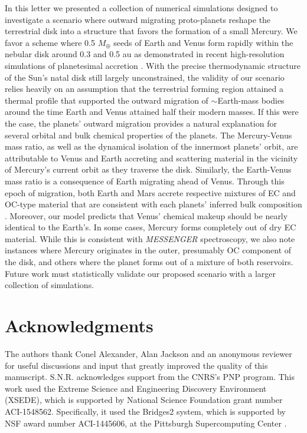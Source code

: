 \documentclass[trackchanges,twocolumn]{aastex}
\begin{document}
In this letter we presented a collection of numerical simulations designed to investigate a scenario where outward migrating proto-planets reshape the terrestrial disk into a structure that favors the formation of a small Mercury.  We favor a scheme where 0.5 $M_{\oplus}$ seeds of Earth and Venus form rapidly within the nebular disk around 0.3 and 0.5 au as demonstrated in recent high-resolution simulations of planetesimal accretion \citep{clement20_psj,woo21}.  With the precise thermodynamic structure of the Sun's natal disk still largely unconstrained, the validity of our scenario relies heavily on an assumption that the terrestrial forming region attained a thermal profile that supported the outward migration of $\sim$Earth-mass bodies around the time Earth and Venus attained half their modern masses.  If this were the case, the planets' outward migration provides a natural explanation for several orbital and bulk chemical properties of the planets.  The Mercury-Venus mass ratio, as well as the dynamical isolation of the innermost planets' orbit, are attributable to Venus and Earth accreting and scattering material in the vicinity of Mercury's current orbit as they traverse the disk.  Similarly, the Earth-Venus mass ratio is a consequence of Earth migrating ahead of Venus.  Through this epoch of migration, both Earth and Mars accrete respective mixtures of EC and OC-type material that are consistent with each planets' inferred bulk composition \citep{javoy10,tang14}.  Moreover, our model predicts that Venus' chemical makeup should be nearly identical to the Earth's.  In some cases, Mercury forms completely out of dry EC material.  While this is consistent with \textit{MESSENGER} spectroscopy, we also note instances where Mercury originates in the outer, presumably OC component of the disk, and others where the planet forms out of a mixture of both reservoirs.  Future work must statistically validate our proposed scenario with a larger collection of simulations.  

\section*{Acknowledgments}
The authors thank Conel Alexander, Alan Jackson and an anonymous reviewer for useful discussions and input that greatly improved the quality of this manuscript.  S.N.R. acknowledges support from the CNRS’s PNP program.  This work used the Extreme Science and Engineering Discovery Environment (XSEDE), which is supported by National Science Foundation grant number ACI-1548562. Specifically, it used the Bridges2 system, which is supported by NSF award number ACI-1445606, at the Pittsburgh Supercomputing Center \citep[PSC:][]{xsede}.

\newcommand{\sci}{$Science$ }

\end{document}
